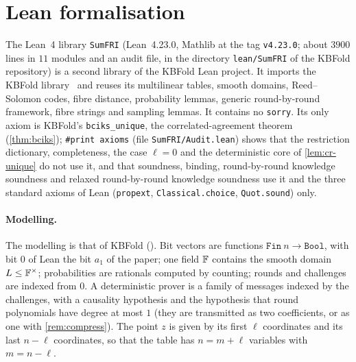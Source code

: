 \section{Lean formalisation}\label{app:lean}

The Lean~4 library \texttt{SumFRI} (Lean~4.23.0, Mathlib at the tag \texttt{v4.23.0}; about $3900$ lines in $11$ modules and an audit file, in the directory \texttt{lean/SumFRI} of the KBFold repository) is a second library of the KBFold Lean project.
It imports the KBFold library~\cite{Mkh26} and reuses its multilinear tables, smooth domains, Reed--Solomon codes, fibre distance, probability lemmas, generic round-by-round framework, fibre strings and sampling lemmas.
It contains no \texttt{sorry}. Its only axiom is KBFold's \texttt{bciks\_unique}, the correlated-agreement theorem (\cref{thm:bciks}); \texttt{\#print axioms} (file \texttt{SumFRI/Audit.lean}) shows that the restriction dictionary, completeness, the case $\ell = 0$ and the deterministic core of \cref{lem:cr-unique} do not use it, and that soundness, binding, round-by-round knowledge soundness and relaxed round-by-round knowledge soundness use it and the three standard axioms of Lean (\texttt{propext}, \texttt{Classical.choice}, \texttt{Quot.sound}) only.

\paragraph{Modelling.}
The modelling is that of KBFold ().
Bit vectors are functions $\mathtt{Fin}\ n \to \mathtt{Bool}$, with bit $0$ of Lean the bit $a_1$ of the paper; one field $\mathbb{F}$ contains the smooth domain $L \le \mathbb{F}^\times$; probabilities are rationals computed by counting; rounds and challenges are indexed from $0$.
A deterministic prover is a family of messages indexed by the challenges, with a causality hypothesis and the hypothesis that round polynomials have degree at most $1$ (they are transmitted as two coefficients, or as one with \cref{rem:compress}).
The point $z$ is given by its first $\ell$ coordinates and its last $n - \ell$ coordinates, so that the table has $n = m + \ell$ variables with $m = n - \ell$.

